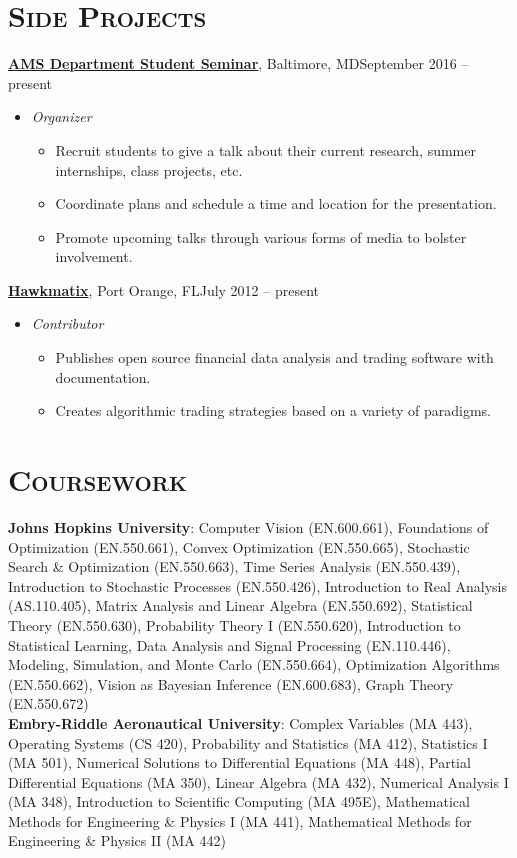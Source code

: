 \documentclass[10pt]{article}
\begin{document}
\section*{\textsc{Side Projects}}
\textbf{\href{http://www.ams.jhu.edu/~ahawki14/student_seminar}{AMS Department Student Seminar}}, Baltimore, MD\hfill September 2016 -- present
\begin{itemize}[noitemsep]
    \item[] \textit{Organizer}
    \begin{itemize}[noitemsep]
        \item Recruit students to give a talk about their current research, summer internships, class projects, etc.
        \item Coordinate plans and schedule a time and location for the presentation.
        \item Promote upcoming talks through various forms of media to bolster involvement.
    \end{itemize}
\end{itemize}
\textbf{\href{www.hawkmatix.com}{Hawkmatix}}, Port Orange, FL\hfill July 2012 -- present
\begin{itemize}[noitemsep]
    \item[] \textit{Contributor}
    \begin{itemize}[noitemsep]
        \item Publishes open source financial data analysis and trading software with documentation.
        \item Creates algorithmic trading strategies based on a variety of paradigms.
    \end{itemize}
\end{itemize}

\section*{\textsc{Coursework}}
\textbf{Johns Hopkins University}: Computer Vision (EN.600.661), Foundations of Optimization (EN.550.661), Convex Optimization (EN.550.665), Stochastic Search \& Optimization (EN.550.663), Time Series Analysis (EN.550.439), Introduction to Stochastic Processes (EN.550.426), Introduction to Real Analysis (AS.110.405), Matrix Analysis and Linear Algebra (EN.550.692), Statistical Theory (EN.550.630), Probability Theory I (EN.550.620), Introduction to Statistical Learning, Data Analysis and Signal Processing (EN.110.446), Modeling, Simulation, and Monte Carlo (EN.550.664), Optimization Algorithms (EN.550.662), Vision as Bayesian Inference (EN.600.683), Graph Theory (EN.550.672)
\newline\\
\textbf{Embry-Riddle Aeronautical University}: Complex Variables (MA 443), Operating Systems (CS 420), Probability and Statistics (MA 412), Statistics I (MA 501), Numerical Solutions to Differential Equations (MA 448), Partial Differential Equations (MA 350), Linear Algebra (MA 432), Numerical Analysis I (MA 348), Introduction to Scientific Computing (MA 495E), Mathematical Methods for Engineering \& Physics I (MA 441), Mathematical Methods for Engineering \& Physics II (MA 442)
\end{document}
